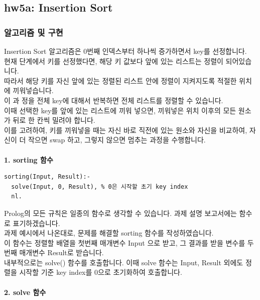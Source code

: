 \documentclass{article}
\begin{document}
\subsection{hw5a: Insertion Sort}

\subsubsection{알고리즘 및 구현}
\quad Insertion Sort 알고리즘은 0번째 인덱스부터 하나씩 증가하면서 key를 선정합니다.\\
현재 단계에서 키를 선정했다면, 해당 키 값보다 앞에 있는 리스트는 정렬이 되어있습니다.\\
따라서 해당 키를 자신 앞에 있는 정렬된 리스트 안에 정렬이 지켜지도록 적절한 위치에 끼워넣습니다.\\
이 과 정을 전체 key에 대해서 반복하면 전체 리스트를 정렬할 수 있습니다.\\
이때 선택한 key를 앞에 있는 리스트에 끼워 넣으면, 끼워넣은 위치 이후의 모든 원소가 뒤로 한 칸씩 밀려야 합니다.\\
이를 고려하여, 키를 끼워넣을 때는 자신 바로 직전에 있는 원소와 자신을 비교하여, 자신이 더 작으면 swap 하고, 그렇지 않으면 멈추는 과정을 수행합니다.\\\\
\textbf{1. sorting 함수}
\begin{verbatim}
sorting(Input, Result):-
  solve(Input, 0, Result), % 0은 시작할 초기 key index
  nl.
\end{verbatim}
Prolog의 모든 규칙은 일종의 함수로 생각할 수 있습니다. 과제 설명 보고서에는 함수로 표기하겠습니다.\\
과제 예시에서 나온대로, 문제를 해결할 sorting 함수를 작성하였습니다.\\
이 함수는 정렬할 배열을 첫번째 매개변수 Input 으로 받고, 그 결과를 받을 변수를 두번째 매개변수 Result로 받습니다.\\
내부적으로는 solve() 함수를 호출합니다. 이때 solve 함수는 Input, Result 외에도 정렬을 시작할 기준 key index를 0으로 초기화하여 호출합니다.\\\\
\textbf{2. solve 함수}
\end{document}

